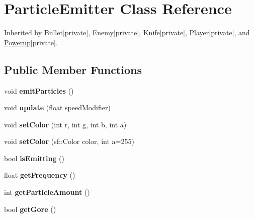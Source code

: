 \hypertarget{class_particle_emitter}{\section{Particle\+Emitter Class Reference}
\label{class_particle_emitter}
}


Inherited by \hyperlink{class_bullet}{Bullet}{\ttfamily  \mbox{[}private\mbox{]}}, \hyperlink{class_enemy}{Enemy}{\ttfamily  \mbox{[}private\mbox{]}}, \hyperlink{class_knife}{Knife}{\ttfamily  \mbox{[}private\mbox{]}}, \hyperlink{class_player}{Player}{\ttfamily  \mbox{[}private\mbox{]}}, and \hyperlink{class_powerup}{Powerup}{\ttfamily  \mbox{[}private\mbox{]}}.

\subsection*{Public Member Functions}
\begin{DoxyCompactItemize}
\item 
\hypertarget{class_particle_emitter_a59e863f0386f1de946bb5f5a2eef3358}{void {\bfseries emit\+Particles} ()}\label{class_particle_emitter_a59e863f0386f1de946bb5f5a2eef3358}

\item 
\hypertarget{class_particle_emitter_a1567fd71b41c71b56ee8b72c5bca559c}{void {\bfseries update} (float speed\+Modifier)}\label{class_particle_emitter_a1567fd71b41c71b56ee8b72c5bca559c}

\item 
\hypertarget{class_particle_emitter_aa639c76a4637bba568a407f69e1c8ebd}{void {\bfseries set\+Color} (int r, int g, int b, int a)}\label{class_particle_emitter_aa639c76a4637bba568a407f69e1c8ebd}

\item 
\hypertarget{class_particle_emitter_ac2d2189e309f8e557b214963aeb8aef8}{void {\bfseries set\+Color} (sf\+::\+Color color, int a=255)}\label{class_particle_emitter_ac2d2189e309f8e557b214963aeb8aef8}

\item 
\hypertarget{class_particle_emitter_af5a699705ec1ebc5258087bd8f48dadd}{bool {\bfseries is\+Emitting} ()}\label{class_particle_emitter_af5a699705ec1ebc5258087bd8f48dadd}

\item 
\hypertarget{class_particle_emitter_aa16926ba7ce5cec4a12049d4cb3d84da}{float {\bfseries get\+Frequency} ()}\label{class_particle_emitter_aa16926ba7ce5cec4a12049d4cb3d84da}

\item 
\hypertarget{class_particle_emitter_a47af719c9d36a6cdc2bc21fd5186cfac}{int {\bfseries get\+Particle\+Amount} ()}\label{class_particle_emitter_a47af719c9d36a6cdc2bc21fd5186cfac}

\item 
\hypertarget{class_particle_emitter_a5b55b1ff5f17eadbec7184a8808cd237}{bool {\bfseries get\+Gore} ()}\label{class_particle_emitter_a5b55b1ff5f17eadbec7184a8808cd237}

\end{DoxyCompactItemize}
